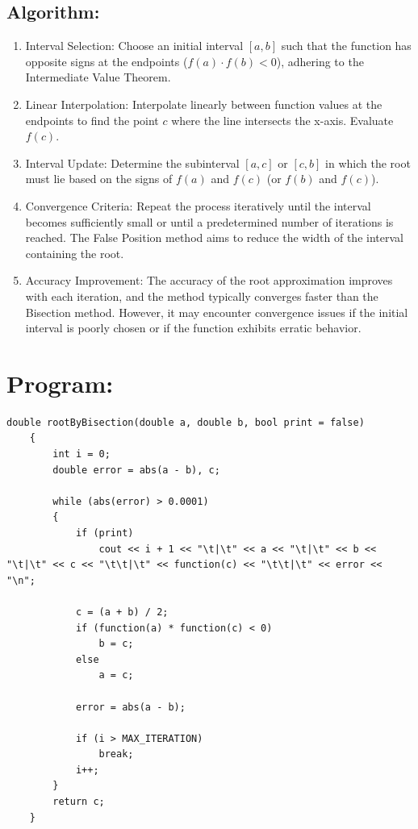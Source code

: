 \documentclass[a4paper,12pt]{report}
\begin{document}
\subsection*{Algorithm:}
\begin{enumerate}
    \item Interval Selection: Choose an initial interval $[a, b]$ such that the function has opposite signs at the endpoints ($f(a) \cdot f(b) < 0$), adhering to the Intermediate Value Theorem.
    \item Linear Interpolation: Interpolate linearly between function values at the endpoints to find the point $c$ where the line intersects the x-axis. Evaluate $f(c)$.
    \item Interval Update: Determine the subinterval $[a, c]$ or $[c, b]$ in which the root must lie based on the signs of $f(a)$ and $f(c)$ (or $f(b)$ and $f(c)$).
    \item Convergence Criteria: Repeat the process iteratively until the interval becomes sufficiently small or until a predetermined number of iterations is reached. The False Position method aims to reduce the width of the interval containing the root.
    \item Accuracy Improvement: The accuracy of the root approximation improves with each iteration, and the method typically converges faster than the Bisection method. However, it may encounter convergence issues if the initial interval is poorly chosen or if the function exhibits erratic behavior.
\end{enumerate}

\section*{Program:}

\begin{lstlisting}[style=cppstyle, caption={Bisection Method}, label={lst:cppcode}, basicstyle=\fontsize{10}{11}\selectfont\ttfamily]
    double rootByBisection(double a, double b, bool print = false)
    {
        int i = 0;
        double error = abs(a - b), c;

        while (abs(error) > 0.0001)
        {
            if (print)
                cout << i + 1 << "\t|\t" << a << "\t|\t" << b << "\t|\t" << c << "\t\t|\t" << function(c) << "\t\t|\t" << error << "\n";

            c = (a + b) / 2;
            if (function(a) * function(c) < 0)
                b = c;
            else
                a = c;

            error = abs(a - b);

            if (i > MAX_ITERATION)
                break;
            i++;
        }
        return c;
    }
\end{lstlisting}
\end{document}
